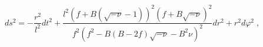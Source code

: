 \begin{equation}
ds^{2}=-\frac{r^{2}}{l^{2}}dt^{2}+\frac{l^{2}(f+B(\sqrt{-\nu }-1))^{2}(f+B%
\sqrt{-\nu })^{2}}{f^{2}(f^{2}-B(B-2f)\sqrt{-\nu }-B^{2}\nu )^{2}}%
dr^{2}+r^{2}d\varphi ^{2}\;,  \label{NS}
\end{equation}

